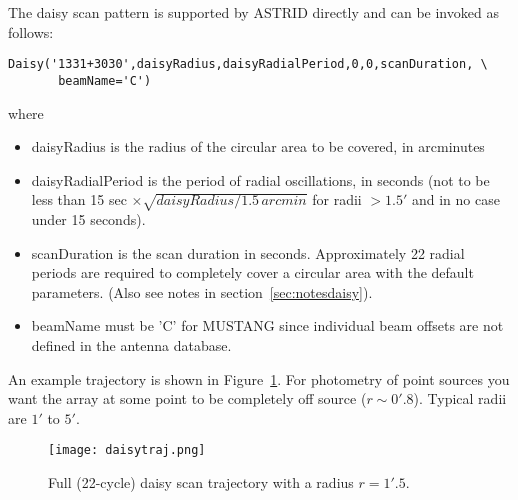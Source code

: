 The daisy scan pattern is supported by ASTRID directly and can
be invoked as follows:
\begin{lstlisting}
Daisy('1331+3030',daisyRadius,daisyRadialPeriod,0,0,scanDuration, \
       beamName='C')
\end{lstlisting}
where
\begin{itemize}
\item daisyRadius is the radius of the circular area to be covered, in arcminutes
\item daisyRadialPeriod is the period of radial oscillations, in seconds (not to be less than 15 sec $\times 
\sqrt{daisyRadius/1.5 \,arcmin}$ for radii $>1.5'$ and in no case under 15 seconds).
\item scanDuration is the scan duration in seconds. Approximately 22 radial periods are required to completely
cover a circular area with the default parameters.
(Also see notes in section~\ref{sec:notesdaisy}).
\item beamName must be 'C' for MUSTANG since individual beam offsets are not defined in the antenna
database.
\end{itemize}
An example trajectory is shown in Figure~\ref{fig:daisytraj}. For
photometry of point sources you want the array at some point to be
completely off source ($r\sim 0'.8$). Typical radii are $1'$ to $5'$.

\begin{figure}
\texttt{[image: daisytraj.png]}
\caption{Full (22-cycle) daisy scan trajectory with a radius $r=1'.5$.}
\label{fig:daisytraj}
\end{figure}

